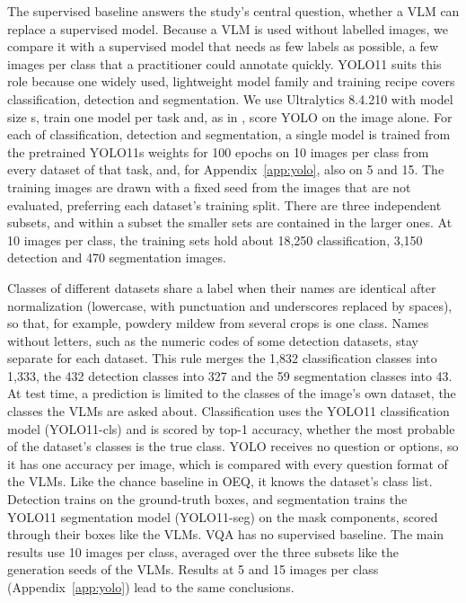 \documentclass[10pt,letterpaper]{article}
\begin{document}
The supervised baseline answers the study's central question, whether a VLM can replace a supervised model. Because a VLM is used without labelled images, we compare it with a supervised model that needs as few labels as possible, a few images per class that a practitioner could annotate quickly. YOLO11 \cite{khanam_yolov11_2024} suits this role because one widely used, lightweight model family and training recipe covers classification, detection and segmentation. We use Ultralytics 8.4.210 with model size s, train one model per task and, as in \cite{ranario_are_2025}, score YOLO on the image alone. For each of classification, detection and segmentation, a single model is trained from the pretrained YOLO11s weights for 100 epochs on 10 images per class from every dataset of that task, and, for Appendix~\ref{app:yolo}, also on 5 and 15. The training images are drawn with a fixed seed from the images that are not evaluated, preferring each dataset's training split. There are three independent subsets, and within a subset the smaller sets are contained in the larger ones. At 10 images per class, the training sets hold about 18,250 classification, 3,150 detection and 470 segmentation images.

Classes of different datasets share a label when their names are identical after normalization (lowercase, with punctuation and underscores replaced by spaces), so that, for example, powdery mildew from several crops is one class. Names without letters, such as the numeric codes of some detection datasets, stay separate for each dataset. This rule merges the 1,832 classification classes into 1,333, the 432 detection classes into 327 and the 59 segmentation classes into 43. At test time, a prediction is limited to the classes of the image's own dataset, the classes the VLMs are asked about. Classification uses the YOLO11 classification model (YOLO11-cls) and is scored by top-1 accuracy, whether the most probable of the dataset's classes is the true class. YOLO receives no question or options, so it has one accuracy per image, which is compared with every question format of the VLMs. Like the chance baseline in OEQ, it knows the dataset's class list. Detection trains on the ground-truth boxes, and segmentation trains the YOLO11 segmentation model (YOLO11-seg) on the mask components, scored through their boxes like the VLMs. VQA has no supervised baseline. The main results use 10 images per class, averaged over the three subsets like the generation seeds of the VLMs. Results at 5 and 15 images per class (Appendix~\ref{app:yolo}) lead to the same conclusions.
\end{document}
